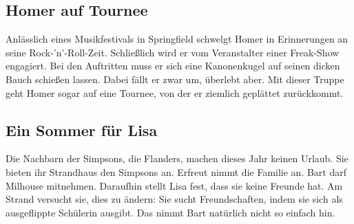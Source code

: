 \subsection{Homer auf Tournee}
Anlässlich eines Musikfestivals in Springfield schwelgt Homer in Erinnerungen an seine Rock-'n'-Roll-Zeit. Schließlich wird er vom Veranstalter einer Freak-Show engagiert. Bei den Auftritten muss er sich eine Kanonenkugel auf seinen dicken Bauch schießen lassen. Dabei fällt er zwar um, überlebt aber. Mit dieser Truppe geht Homer sogar auf eine Tournee, von der er ziemlich geplättet zurückkommt.



	
\subsection{Ein Sommer für Lisa}\label{3F22}
Die Nachbarn der Simpsons, die Flanders, machen dieses Jahr keinen Urlaub. Sie bieten ihr Strandhaus den Simpsons an. Erfreut nimmt die Familie an. Bart darf Milhouse mitnehmen. Daraufhin stellt Lisa fest, dass sie keine Freunde hat. Am Strand versucht sie, dies zu ändern: Sie sucht Freundschaften, indem sie sich als ausgeflippte Schülerin ausgibt. Das nimmt Bart natürlich nicht so einfach hin.

